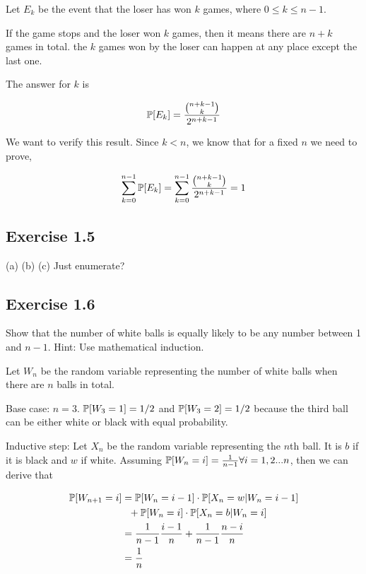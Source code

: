 Let $E_k$ be the event that the loser has won $k$ games, where $0 \leq k \leq n-1$.

If the game stops and the loser won $k$ games, then it means there are $n + k$ games in total. the $k$ games
won by the loser can happen at any place except the last one. 

The answer for $k$ is 

\begin{equation*}
\P[E_k] = \frac{\binom{n+k-1}{k}}{2^{n+k-1}}
\end{equation*}

We want to verify this result. Since $k < n$, we know that for a fixed $n$ we need to prove,

\begin{equation*}
\sum_{k = 0}^{n - 1} \P[E_k] = \sum_{k = 0}^{n - 1} \frac{\binom{n+k-1}{k}}{2^{n+k-1}} = 1
\end{equation*}



\subsection*{Exercise 1.5}

(a) (b) (c) Just enumerate?

\subsection*{Exercise 1.6}

Show that the number of white balls is equally likely to be any number between 1 and $n-1$.
Hint: Use mathematical induction.

Let $W_n$ be the random variable representing the number of white balls when there are
$n$ balls in total.

Base case: $n = 3$. $\P[W_3 = 1] = 1/2$ and $\P[W_3 = 2] = 1/2$ because the third
ball can be either white or black with equal probability.

Inductive step: Let $X_n$ be the random variable representing the $n$th ball. It is $b$ if it is
black and $w$ if white.
Assuming $\P[W_n = i] = \frac{1}{n-1} \forall i = 1,2...n$, then we can derive that

\begin{equation*}
\begin{split}
\P[W_{n+1} = i] & = \P[W_n = i - 1] \cdot \P[X_n = w | W_n = i - 1] \\
&\ \ + \P[W_n = i] \cdot \P[X_n = b | W_n = i] \\
& = \frac{1}{n-1} \frac{i - 1}{n} + \frac{1}{n - 1} \frac{n - i}{n} \\
& = \frac{1}{n}
\end{split}
\end{equation*}

